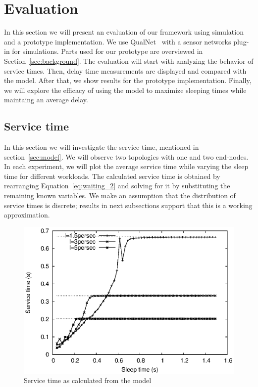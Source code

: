 \section{Evaluation}

In this section we will present an evaluation of our framework using simulation and a prototype implementation. We use QualNet~\cite{qualnet} with a sensor networks plug-in for simulations. Parts used for our prototype are overviewed in Section~\ref{sec:background}. The evaluation will start with analyzing the behavior of service times. Then, delay time measurements are displayed and compared with the model. After that, we show results for the prototype implementation. Finally, we will explore the efficacy of using the model to maximize sleeping times while maintaing an average delay.

\subsection{Service time}
In this section we will investigate the service time, mentioned in section~\ref{sec:model}. We will observe two topologies with one and two end-nodes. In each experiment, we will plot the average service time while varying the sleep time for different workloads. The calculated service time is obtained by rearranging Equation~\ref{eq:waiting_2} and solving for it by substituting the remaining known variables. We make an assumption that the distribution of service times is discrete; results in next subsections support that this is a working approximation. 

\begin{figure}[t]
\centering
\includegraphics[scale=0.65]{figures/3node_varySleep_sim_x.eps}
\caption{Service time as calculated from the model}
\label{fig:3nodes_x}
\end{figure}

